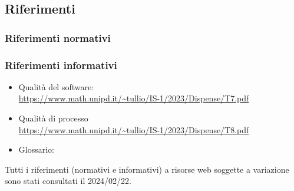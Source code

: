 \subsection{Riferimenti}
\subsubsection{Riferimenti normativi}
\subsubsection{Riferimenti informativi}
\begin{itemize}
    \item Qualità del software: \\
    \url{https://www.math.unipd.it/~tullio/IS-1/2023/Dispense/T7.pdf}
    \item Qualità di processo\\
    \url{https://www.math.unipd.it/~tullio/IS-1/2023/Dispense/T8.pdf}
    \item Glossario: \\
    \url{} %
\end{itemize}

Tutti i riferimenti (normativi e informativi) a risorse web soggette a variazione sono stati consultati il 2024/02/22.

